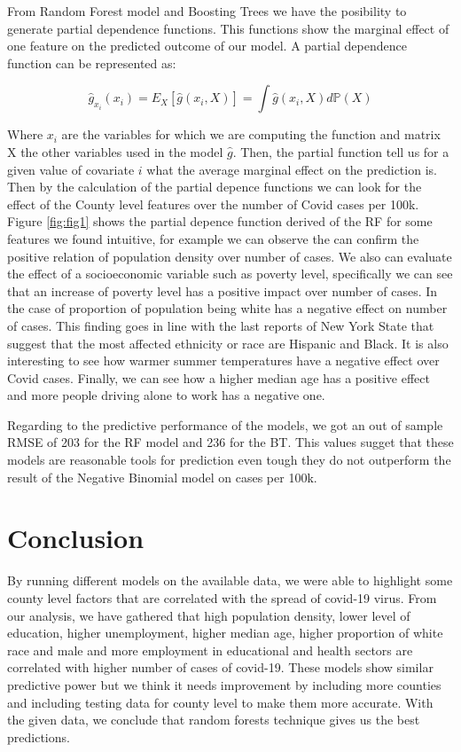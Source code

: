 \documentclass[
]{article}
\begin{document}
From Random Forest model and Boosting Trees we have the posibility to
generate partial dependence functions. This functions show the marginal
effect of one feature on the predicted outcome of our model. A partial
dependence function can be represented as:

\[\hat{g}_{x_i}(x_i)=E_{X}\left[\hat{g}(x_i,X)\right]=\int\hat{g}(x_i,X)d\mathbb{P}(X)\]

Where \(x_i\) are the variables for which we are computing the function
and matrix X the other variables used in the model \(\hat{g}\). Then,
the partial function tell us for a given value of covariate \(i\) what
the average marginal effect on the prediction is. Then by the
calculation of the partial depence functions we can look for the effect
of the County level features over the number of Covid cases per 100k.
Figure \ref{fig:fig1} shows the partial depence function derived of the
RF for some features we found intuitive, for example we can observe the
can confirm the positive relation of population density over number of
cases. We also can evaluate the effect of a socioeconomic variable such
as poverty level, specifically we can see that an increase of poverty
level has a positive impact over number of cases. In the case of
proportion of population being white has a negative effect on number of
cases. This finding goes in line with the last reports of New York State
that suggest that the most affected ethnicity or race are Hispanic and
Black. It is also interesting to see how warmer summer temperatures have
a negative effect over Covid cases. Finally, we can see how a higher
median age has a positive effect and more people driving alone to work
has a negative one.

Regarding to the predictive performance of the models, we got an out of
sample RMSE of 203 for the RF model and 236 for the BT. This values
sugget that these models are reasonable tools for prediction even tough
they do not outperform the result of the Negative Binomial model on
cases per 100k.

\hypertarget{conclusion}{%
\section{Conclusion}\label{conclusion}}

By running different models on the available data, we were able to
highlight some county level factors that are correlated with the spread
of covid-19 virus. From our analysis, we have gathered that high
population density, lower level of education, higher unemployment,
higher median age, higher proportion of white race and male and more
employment in educational and health sectors are correlated with higher
number of cases of covid-19. These models show similar predictive power
but we think it needs improvement by including more counties and
including testing data for county level to make them more accurate. With
the given data, we conclude that random forests technique gives us the
best predictions.
\end{document}
